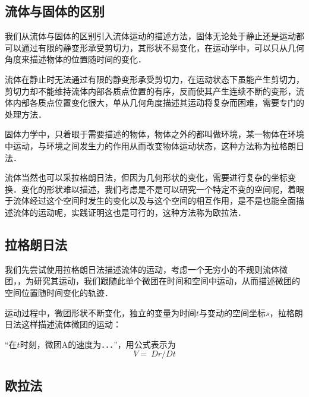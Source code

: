 
\subsection{流体与固体的区别}
我们从流体与固体的区别引入流体运动的描述方法，固体无论处于静止还是运动都可以通过有限的静变形承受剪切力，其形状不易变化，在运动学中，可以只从几何角度来描述物体的位置随时间的变化．

流体在静止时无法通过有限的静变形承受剪切力，在运动状态下虽能产生剪切力，剪切力却不能维持流体内部各质点位置的有序，反而使其产生连续不断的变形，流体内部各质点位置变化很大，单从几何角度描述其运动将复杂而困难，需要专门的处理方法．

固体力学中，只着眼于需要描述的物体，物体之外的都叫做环境，某一物体在环境中运动，与环境之间发生力的作用从而改变物体运动状态，这种方法称为拉格朗日法．

流体当然也可以采拉格朗日法，但因为几何形状的变化，需要进行复杂的坐标变换．变化的形状难以描述，我们考虑是不是可以研究一个特定不变的空间呢，着眼于流体经过这个空间时发生的变化以及与这个空间的相互作用，是不是也能全面描述流体的运动呢，实践证明这也是可行的，这种方法称为欧拉法．

\subsection{拉格朗日法}
我们先尝试使用拉格朗日法描述流体的运动，考虑一个无穷小的不规则流体微团，，为研究其运动，我们跟随此单个微团在时间和空间中运动，从而描述微团的空间位置随时间变化的轨迹．

运动过程中，微团形状不断变化，独立的变量为时间$t$与变动的空间坐标$s$，拉格朗日法这样描述流体微团的运动：

“在$t$时刻，微团A的速度为．．．”，用公式表示为
\begin{equation}
V=\ Dr/Dt
\end{equation}


\subsection{欧拉法}